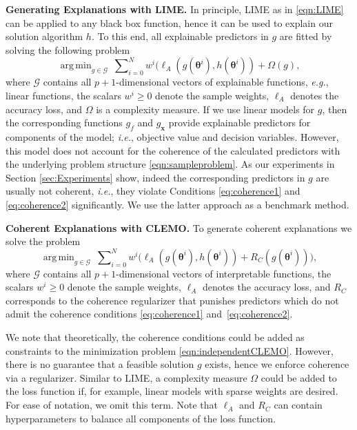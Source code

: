 \documentclass{article}
\DeclareMathOperator*{\argmin}{arg\,min}
\theoremstyle{plain}
\theoremstyle{definition}
\theoremstyle{remark}
\begin{document}
\textbf{Generating Explanations with LIME.} In principle, LIME as in \eqref{eqn:LIME} can be applied to any black box function, hence it can be used to explain our solution algorithm $h$. To this end, all explainable predictors in $g$ are fitted by solving the following problem 
\begin{equation}
\label{eqn:independentCLEMO}
\argmin_{g\in\mathcal{G}} ~ \sum\nolimits_{i=0}^N w^i \big(\ell_A(g(\bm{\theta}^i), h(\bm{\theta}^i)) + \Omega(g),
\end{equation}
where $\mathcal{G}$ contains all $p+1$-dimensional vectors of explainable functions, \textit{e.g.}, linear functions, the scalars $w^i \geq 0$ denote the sample weights, $\ell_A$ denotes the accuracy loss, and $\Omega$ is a complexity measure. If we use linear models for $g$, then the corresponding functions $g_{f}$ and $g_{\bm{x}}$ provide explainable predictors for components of the model; \textit{i.e.}, objective value and decision variables. However, this model does not account for the coherence of the calculated predictors with the underlying problem structure \eqref{eqn:sampleproblem}. As our experiments in Section \ref{sec:Experiments} show, indeed the corresponding predictors in $g$ are usually not coherent, \textit{i.e.}, they violate Conditions \ref{eq:coherence1} and \ref{eq:coherence2} significantly. We use the latter approach as a benchmark method.

\textbf{Coherent Explanations with CLEMO.} To generate coherent explanations we solve the problem
\begin{equation}
\label{eqn:CLEMO}
\argmin_{g\in\mathcal{G}} ~ \sum\nolimits_{i=0}^N w^i \big(\ell_A(g(\bm{\theta}^i), h(\bm{\theta}^i)) + R_C(g(\bm{\theta}^i))\big),
\end{equation}
where $\mathcal{G}$ contains all $p+1$-dimensional vectors of interpretable functions,  the scalars $w^i \geq 0$ denote the sample weights, $\ell_A$ denotes the accuracy loss, and $R_C$ corresponds to the coherence regularizer that punishes predictors which do not admit the coherence conditions \eqref{eq:coherence1} and~\eqref{eq:coherence2}. 

We note that theoretically, the coherence conditions could be added as constraints to the minimization problem \eqref{eqn:independentCLEMO}. However, there is no guarantee that a feasible solution $g$ exists, hence we enforce coherence via a regularizer. Similar to LIME, a complexity measure $\Omega$ could be added to the loss function if, for example, linear models with sparse weights are desired. For ease of notation, we omit this term. Note that $\ell_A$ and $R_C$ can contain hyperparameters to balance all components of the loss function. 
\end{document}

